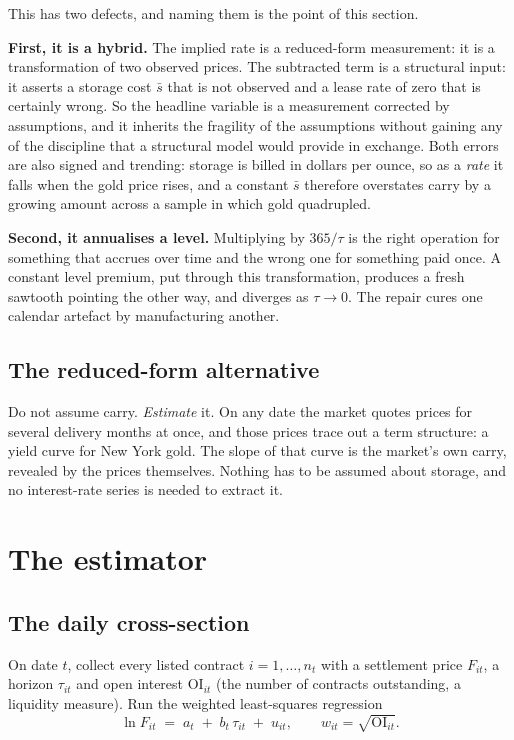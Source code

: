 \documentclass[11pt,a4paper]{article}
\begin{document}
This has two defects, and naming them is the point of this section.

\textbf{First, it is a hybrid.} The implied rate is a reduced-form measurement:
it is a transformation of two observed prices. The subtracted term is a
structural input: it asserts a storage cost $\bar s$ that is not observed and a
lease rate of zero that is certainly wrong. So the headline variable is a
measurement corrected by assumptions, and it inherits the fragility of the
assumptions without gaining any of the discipline that a structural model
would provide in exchange. Both errors are also signed and trending: storage is
billed in dollars per ounce, so as a \emph{rate} it falls when the gold price
rises, and a constant $\bar s$ therefore overstates carry by a growing amount
across a sample in which gold quadrupled.

\textbf{Second, it annualises a level.} Multiplying by $365/\tau$ is the right
operation for something that accrues over time and the wrong one for something
paid once. A constant level premium, put through this transformation, produces
a fresh sawtooth pointing the other way, and diverges as $\tau\to 0$. The
repair cures one calendar artefact by manufacturing another.

\subsection*{The reduced-form alternative}

Do not assume carry. \emph{Estimate} it. On any date the market quotes prices
for several delivery months at once, and those prices trace out a term
structure: a yield curve for New York gold. The slope of that curve is the
market's own carry, revealed by the prices themselves. Nothing has to be
assumed about storage, and no interest-rate series is needed to extract it.

\section{The estimator}
\label{sec:estimator}

\subsection*{The daily cross-section}

On date $t$, collect every listed contract $i=1,\dots,n_t$ with a settlement
price $F_{it}$, a horizon $\tau_{it}$ and open interest $\mathrm{OI}_{it}$
(the number of contracts outstanding, a liquidity measure). Run the weighted
least-squares regression
\begin{equation}
\ln F_{it} \;=\; a_t \;+\; b_t\,\tau_{it} \;+\; u_{it},
\qquad w_{it}=\sqrt{\mathrm{OI}_{it}} .
\label{eq:cs}
\end{equation}
\end{document}
